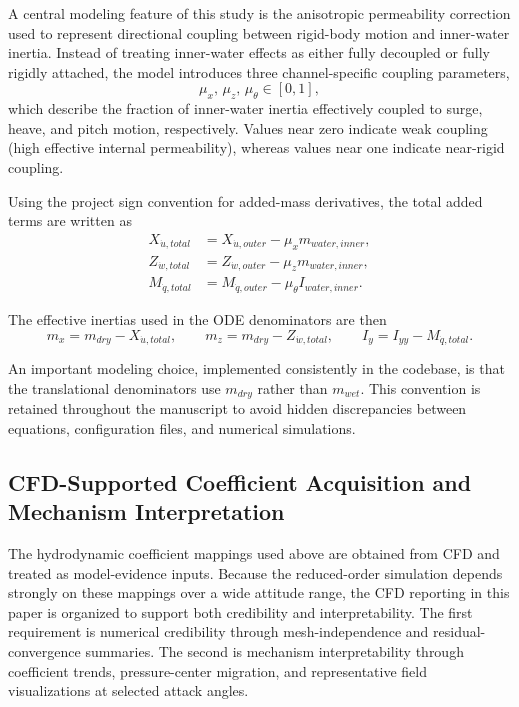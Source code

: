 A central modeling feature of this study is the anisotropic permeability correction used to represent directional coupling between rigid-body motion and inner-water inertia. Instead of treating inner-water effects as either fully decoupled or fully rigidly attached, the model introduces three channel-specific coupling parameters,
\[
\mu_x,\,\mu_z,\,\mu_{\theta} \in [0,1],
\]
which describe the fraction of inner-water inertia effectively coupled to surge, heave, and pitch motion, respectively. Values near zero indicate weak coupling (high effective internal permeability), whereas values near one indicate near-rigid coupling.

Using the project sign convention for added-mass derivatives, the total added terms are written as
\[
\begin{aligned}
X_{\dot{u},total} &= X_{\dot{u},outer} - \mu_x m_{water,inner}, \\
Z_{\dot{w},total} &= Z_{\dot{w},outer} - \mu_z m_{water,inner}, \\
M_{\dot{q},total} &= M_{\dot{q},outer} - \mu_{\theta} I_{water,inner}.
\end{aligned}
\]

The effective inertias used in the ODE denominators are then
\[
m_x=m_{dry}-X_{\dot{u},total}, \qquad m_z=m_{dry}-Z_{\dot{w},total}, \qquad I_y=I_{yy}-M_{\dot{q},total}.
\]

An important modeling choice, implemented consistently in the codebase, is that the translational denominators use $m_{dry}$ rather than $m_{wet}$. This convention is retained throughout the manuscript to avoid hidden discrepancies between equations, configuration files, and numerical simulations.


\subsection{CFD-Supported Coefficient Acquisition and Mechanism Interpretation}

The hydrodynamic coefficient mappings used above are obtained from CFD and treated as model-evidence inputs. Because the reduced-order simulation depends strongly on these mappings over a wide attitude range, the CFD reporting in this paper is organized to support both credibility and interpretability. The first requirement is numerical credibility through mesh-independence and residual-convergence summaries. The second is mechanism interpretability through coefficient trends, pressure-center migration, and representative field visualizations at selected attack angles.

